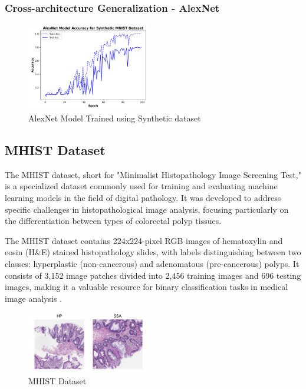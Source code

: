 \documentclass[conference, compsoc]{IEEEtran}
\begin{document}
\subsubsection{Cross-architecture Generalization - AlexNet}
\begin{figure}[H]
	\centering
	\includegraphics[width=0.48\textwidth]{mnist_alex_acc.png}
	\caption{AlexNet Model Trained using Synthetic dataset}
	\label{fig:mnist_alex_acc}
\end{figure}
\subsection{MHIST Dataset}
The MHIST dataset, short for "Minimalist Histopathology Image Screening Test," is a specialized dataset commonly used for training and evaluating machine learning models in the field of digital pathology. It was developed to address specific challenges in histopathological image analysis, focusing particularly on the differentiation between types of colorectal polyp tissues.

The MHIST dataset contains 224x224-pixel RGB images of hematoxylin and eosin (H\&E) stained histopathology slides, with labels distinguishing between two classes: hyperplastic (non-cancerous) and adenomatous (pre-cancerous) polyps. It consists of 3,152 image patches divided into 2,456 training images and 696 testing images, making it a valuable resource for binary classification tasks in medical image analysis \cite{wei2021petri}.
\begin{figure}[H]
	\centering
	\includegraphics[width=0.48\textwidth]{MHIST_dataset.png}
	\caption{MHIST Dataset \cite{wei2021petri}}
	\label{fig:mhist_dataset}
\end{figure}
\end{document}
